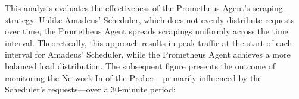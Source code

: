 This analysis evaluates the effectiveness of the Prometheus Agent's scraping strategy. Unlike Amadeus' Scheduler, which does not evenly distribute requests over time, the Prometheus Agent spreads scrapings uniformly across the time interval. Theoretically, this approach results in peak traffic at the start of each interval for Amadeus' Scheduler, while the Prometheus Agent achieves a more balanced load distribution. The subsequent figure presents the outcome of monitoring the Network In of the Prober—primarily influenced by the Scheduler's requests—over a 30-minute period:

\begin{figure}[htpb]
  \centering
\end{figure}
